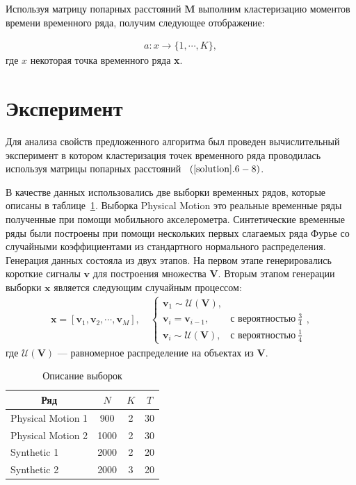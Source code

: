 \documentclass[12pt, twoside]{article}
\numberwithin{equation}{section}
\begin{document}
Используя матрицу попарных расстояний $\textbf{M}$ выполним кластеризацию моментов времени временного ряда, получим следующее отображение:

\begin{equation}
\label{eq:cl:10}
\begin{aligned}
a : x \to \{1,\cdots, K\}, 
\end{aligned}
\end{equation}
где $x$ некоторая точка временного ряда \textbf{x}.


\section{Эксперимент}
Для анализа свойств предложенного алгоритма был проведен вычислительный эксперимент в котором кластеризация точек временного ряда проводилась используя матрицы попарных расстояний ~$(\ref{solution}.6-8)$.

В качестве данных использовались две выборки временных рядов, которые описаны в таблице~\ref{table_1}. Выборка Physical Motion это реальные временные ряды полученные при помощи мобильного акселерометра. Синтетические временные ряды были построены при помощи нескольких первых слагаемых ряда Фурье со случайными коэффициентами из стандартного нормального распределения. Генерация данных состояла из двух этапов. На первом этапе генерировались короткие сигналы $\textbf{v}$ для построения множества $\mathbf{V}$. Вторым этапом генерации выборки $\textbf{x}$ является следующим случайным процессом:
\begin{equation}
\label{eq:exp:1}
\begin{aligned}
\textbf{x} = [\textbf{v}_{1}, \textbf{v}_{2}, \cdots, \textbf{v}_{M}], \quad \begin{cases}
    \textbf{v}_{1} \sim \mathcal{U}\left(\mathbf{V}\right),\\
    \textbf{v}_{i} = \textbf{v}_{i - 1}, & \text{с вероятностью}~\frac{3}{4}\\
    \textbf{v}_{i} \sim \mathcal{U}\left(\mathbf{V}\right), & \text{с вероятностью}~\frac{1}{4}
\end{cases},
\end{aligned}
\end{equation}
где $\mathcal{U}\left(\mathbf{V}\right)$ --- равномерное распределение на объектах из $\mathbf{V}$.

\begin{table}[h]
\begin{center}
\caption{Описание выборок}
\label{table_1}
\begin{tabular}{|c|c|c|c|}
\hline
	Ряд & $N$& $K$& $T$\\
	\hline
	\multicolumn{1}{|l|}{Physical Motion 1}
	& 900& 2& 30\\
	\hline
	\multicolumn{1}{|l|}{Physical Motion 2}
	& 1000& 2& 30\\
	\hline
	\multicolumn{1}{|l|}{Synthetic 1}
	& 2000& 2& 20\\
	\hline
	\multicolumn{1}{|l|}{Synthetic 2}
	& 2000& 3& 20\\
\hline

\end{tabular}
\end{center}
\end{table}
\end{document}
